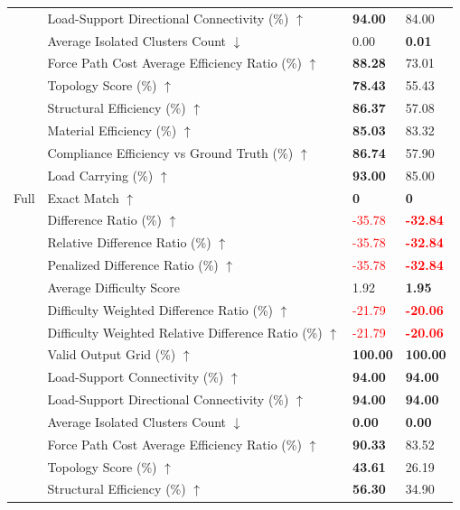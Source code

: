 \begin{table}[!h]
{\begin{tabular}{llll}
 & Load-Support Directional Connectivity (\%) $\uparrow$ & \textbf{94.00} & 84.00 \\
 & Average Isolated Clusters Count $\downarrow$ & 0.00 & \textbf{0.01} \\
 & Force Path Cost Average Efficiency Ratio (\%) $\uparrow$ & \textbf{88.28} & 73.01 \\
 & Topology Score (\%) $\uparrow$ & \textbf{78.43} & 55.43 \\
 & Structural Efficiency (\%) $\uparrow$ & \textbf{86.37} & 57.08 \\
 & Material Efficiency (\%) $\uparrow$ & \textbf{85.03} & 83.32 \\
 & Compliance Efficiency vs Ground Truth (\%) $\uparrow$ & \textbf{86.74} & 57.90 \\
 & Load Carrying (\%) $\uparrow$ & \textbf{93.00} & 85.00 \\
Full & Exact Match $\uparrow$ & \textbf{0} & \textbf{0} \\
 & Difference Ratio (\%) $\uparrow$ & \textcolor{red}{-35.78} & \textbf{\textcolor{red}{-32.84}} \\
 & Relative Difference Ratio (\%) $\uparrow$ & \textcolor{red}{-35.78} & \textbf{\textcolor{red}{-32.84}} \\
 & Penalized Difference Ratio (\%) $\uparrow$ & \textcolor{red}{-35.78} & \textbf{\textcolor{red}{-32.84}} \\
 & Average Difficulty Score & 1.92 & \textbf{1.95} \\
 & Difficulty Weighted Difference Ratio (\%) $\uparrow$ & \textcolor{red}{-21.79} & \textbf{\textcolor{red}{-20.06}} \\
 & Difficulty Weighted Relative Difference Ratio (\%) $\uparrow$ & \textcolor{red}{-21.79} & \textbf{\textcolor{red}{-20.06}} \\
 & Valid Output Grid (\%) $\uparrow$ & \textbf{100.00} & \textbf{100.00} \\
 & Load-Support Connectivity (\%) $\uparrow$ & \textbf{94.00} & \textbf{94.00} \\
 & Load-Support Directional Connectivity (\%) $\uparrow$ & \textbf{94.00} & \textbf{94.00} \\
 & Average Isolated Clusters Count $\downarrow$ & \textbf{0.00} & \textbf{0.00} \\
 & Force Path Cost Average Efficiency Ratio (\%) $\uparrow$ & \textbf{90.33} & 83.52 \\
 & Topology Score (\%) $\uparrow$ & \textbf{43.61} & 26.19 \\
 & Structural Efficiency (\%) $\uparrow$ & \textbf{56.30} & 34.90 \\

\end{tabular}}
\end{table}
